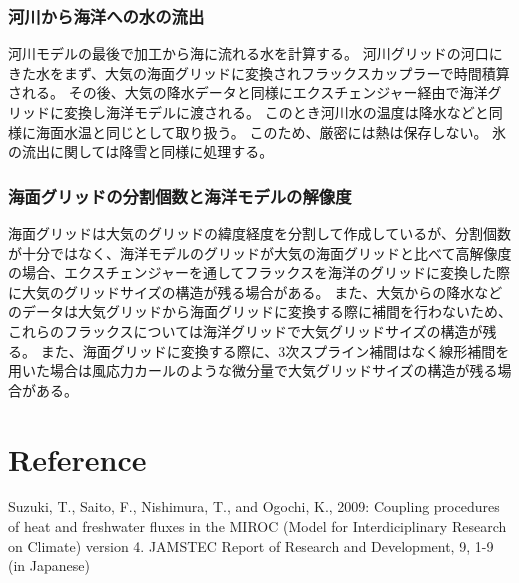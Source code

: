 \hypertarget{ux6cb3ux5dddux304bux3089ux6d77ux6d0bux3078ux306eux6c34ux306eux6d41ux51fa}{%
\subsubsection{河川から海洋への水の流出}\label{ux6cb3ux5dddux304bux3089ux6d77ux6d0bux3078ux306eux6c34ux306eux6d41ux51fa}}

河川モデルの最後で加工から海に流れる水を計算する。
河川グリッドの河口にきた水をまず、大気の海面グリッドに変換されフラックスカップラーで時間積算される。
その後、大気の降水データと同様にエクスチェンジャー経由で海洋グリッドに変換し海洋モデルに渡される。
このとき河川水の温度は降水などと同様に海面水温と同じとして取り扱う。
このため、厳密には熱は保存しない。
氷の流出に関しては降雪と同様に処理する。

\hypertarget{ux6d77ux9762ux30b0ux30eaux30c3ux30c9ux306eux5206ux5272ux500bux6570ux3068ux6d77ux6d0bux30e2ux30c7ux30ebux306eux89e3ux50cfux5ea6}{%
\subsubsection{海面グリッドの分割個数と海洋モデルの解像度}\label{ux6d77ux9762ux30b0ux30eaux30c3ux30c9ux306eux5206ux5272ux500bux6570ux3068ux6d77ux6d0bux30e2ux30c7ux30ebux306eux89e3ux50cfux5ea6}}

海面グリッドは大気のグリッドの緯度経度を分割して作成しているが、分割個数が十分ではなく、海洋モデルのグリッドが大気の海面グリッドと比べて高解像度の場合、エクスチェンジャーを通してフラックスを海洋のグリッドに変換した際に大気のグリッドサイズの構造が残る場合がある。
また、大気からの降水などのデータは大気グリッドから海面グリッドに変換する際に補間を行わないため、これらのフラックスについては海洋グリッドで大気グリッドサイズの構造が残る。
また、海面グリッドに変換する際に、3次スプライン補間はなく線形補間を用いた場合は風応力カールのような微分量で大気グリッドサイズの構造が残る場合がある。

\hypertarget{reference}{%
\section{Reference}\label{reference}}

Suzuki, T., Saito, F., Nishimura, T., and Ogochi, K., 2009: Coupling
procedures of heat and freshwater fluxes in the MIROC (Model for
Interdiciplinary Research on Climate) version 4. JAMSTEC Report of
Research and Development, 9, 1-9 (in Japanese)
